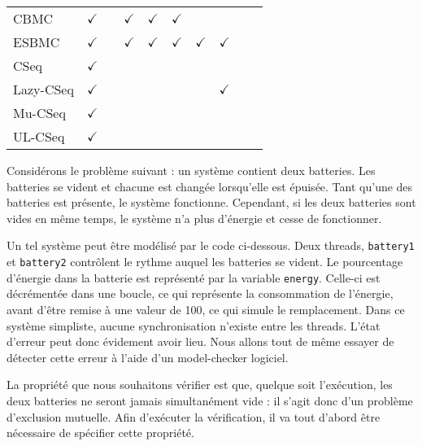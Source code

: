\begin{landscape}
\begin{table}[ht]
\begin{tabular}{|l|c|c|c|c|c|c|c|c|c|}
CBMC       & $\checkmark$ &              & $\checkmark$ & $\checkmark$ & $\checkmark$ &              &              &              &                \\
ESBMC      & $\checkmark$ &              & $\checkmark$ & $\checkmark$ & $\checkmark$ & $\checkmark$ & $\checkmark$ &              &                \\
CSeq       & $\checkmark$ &              &              &              &              &              &              &              &                \\
Lazy-CSeq  & $\checkmark$ &              &              &              &              &              & $\checkmark$ &              &                \\
Mu-CSeq    & $\checkmark$ &              &              &              &              &              &              &              &                \\
UL-CSeq    & $\checkmark$ &              &              &              &              &              &              &              &                \\ \hline
\end{tabular}
\label{tab:prop_type_table}
\end{table}

\end{landscape}




Considérons le problème suivant : un système contient deux batteries. Les
batteries se vident et chacune est changée lorsqu'elle est épuisée. Tant qu'une
des batteries est présente, le système fonctionne. Cependant, si les deux
batteries sont vides en même temps, le système n'a plus d'énergie et cesse de
fonctionner.

Un tel système peut être modélisé par le code ci-dessous. Deux threads,
\texttt{battery1} et \texttt{battery2} contrôlent le rythme auquel les
batteries se vident. Le pourcentage d'énergie dans la batterie est représenté
par la variable \texttt{energy}. Celle-ci est décrémentée dans une
boucle, ce qui représente la consommation de l'énergie, avant d'être remise à
une valeur de 100, ce qui simule le remplacement. Dans ce système simpliste,
aucune synchronisation n'existe entre les threads. L'état d'erreur peut donc
évidement avoir lieu. Nous allons tout de même essayer de détecter cette erreur
à l'aide d'un model-checker logiciel.

La propriété que nous souhaitons vérifier est que, quelque soit
l'exécution, les deux batteries ne seront jamais simultanément vide : il
s'agit donc d'un problème d'exclusion mutuelle. Afin d'exécuter la
vérification, il va tout d'abord être nécessaire de spécifier cette
propriété.

